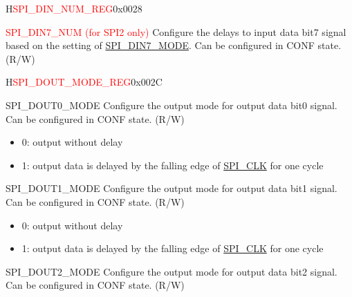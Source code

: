\begin{register}{H}{\textcolor{red}{SPI\_DIN\_NUM\_REG}}{0x{}0028}
\begin{regdesc}
\begin{reglist}
\label{fielddesc:SPIDIN7NUM}\item [\textcolor{red}{SPI\_DIN7\_NUM (for SPI2 only)}] Configure the delays to input data bit7 signal based on the setting of \hyperref[fielddesc:SPIDIN7MODE]{SPI\_DIN7\_MODE}. Can be configured in CONF state. (R/W)

\end{reglist}\end{regdesc}
\end{register}


\begin{register}{H}{\textcolor{red}{SPI\_DOUT\_MODE\_REG}}{0x{}002C}\label{regdesc:SPIDOUTMODEREG}
%
%
%
%
%
%
%
%
%
%
\regnewline%
\begin{regdesc}\begin{reglist}
\label{fielddesc:SPIDOUT0MODE}\item [SPI\_DOUT0\_MODE] Configure the output mode for output data bit0 signal. Can be configured in CONF state. (R/W)

\begin{itemize}
    \item 0: output without delay
    \item 1: output data is delayed by the falling edge of \hyperref[clk:SPICLK]{SPI\_CLK} for one cycle
\end{itemize}

\label{fielddesc:SPIDOUT1MODE}\item [SPI\_DOUT1\_MODE] Configure the output mode for output data bit1 signal. Can be configured in CONF state. (R/W)

\begin{itemize}
    \item 0: output without delay
    \item 1: output data is delayed by the falling edge of \hyperref[clk:SPICLK]{SPI\_CLK} for one cycle
\end{itemize}

\label{fielddesc:SPIDOUT2MODE}\item [SPI\_DOUT2\_MODE] Configure the output mode for output data bit2 signal. Can be configured in CONF state. (R/W)


\end{reglist}
\end{regdesc}
\end{register}
